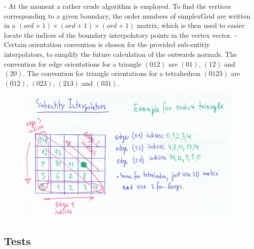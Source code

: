 \documentclass[12pt]{article}
\begin{document}
\begin{itemize}
		\subitem - At the moment a rather crude algorithm is employed. To find the vertices corresponding to a given boundary, the order numbers of simplexGrid are written in a $(ord + 1) \times (ord + 1) \times (ord + 1)$ matrix, which is then used to easier locate the indices of the boundary interpolatory points in the vertex vector.
		\subitem - Certain orientation convention is chosen for the provided sub-entitiy interpolators, to simplify the future calculation of the outwards normals. The convention for edge orientations for a triangle $(012)$ are $(01)$, $(12)$ and $(20)$. The convention for triangle orientations for a tetrahedron $(0123)$ are $(012)$, $(023)$, $(213)$ and $(031)$.
\end{itemize}

\begin{figure}[hp]
    \centering
    \includegraphics[scale=0.5]{doc-pics/pic-subentity-interpolators-method.png}
\end{figure}


\subsection{Tests}
\end{document}
